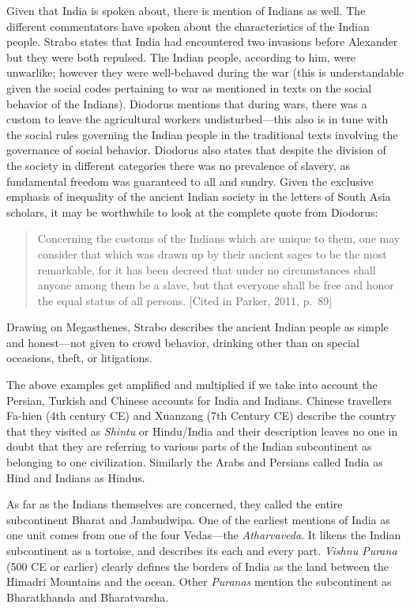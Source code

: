 Given that India is spoken about, there is mention of Indians as well. The different commentators have spoken about the characteristics of the Indian people. Strabo states that India had encountered two invasions before Alexander but they were both repulsed. The Indian people, according to him, were unwarlike; however they were well-behaved during the war (this is understandable given the social codes pertaining to war as mentioned in texts on the social behavior of the Indians). Diodorus mentions that during wars, there was a custom to leave the agricultural workers undisturbed—this also is in tune with the social rules governing the Indian people in the traditional texts involving the governance of social behavior. Diodorus also states that despite the division of the society in different categories there was no prevalence of slavery, as fundamental freedom was guaranteed to all and sundry. Given the exclusive emphasis of inequality of the ancient Indian society in the letters of South Asia scholars, it may be worthwhile to look at the complete quote from Diodorus: 
\begin{quote}
Concerning the customs of the Indians which are unique to them, one may consider that which was drawn up by their ancient sages to be the most remarkable, for it has been decreed that under no circumstances shall anyone among them be a slave, but that everyone shall be free and honor the equal status of all persons. [Cited in Parker, 2011, p.\ 89]
\end{quote}
Drawing on Megasthenes, Strabo describes the ancient Indian people as simple and honest—not given to crowd behavior, drinking other than on special occasions, theft, or litigations.

The above examples get amplified and multiplied if we take into account the Persian, Turkish and Chinese accounts for India and Indians. Chinese travellers Fa-hien (4th century CE) and Xuanzang (7th Century CE) describe the country that they visited as \textit{Shintu} or Hindu/India and their description leaves no one in doubt that they are referring to various parts of the Indian subcontinent as belonging to one civilization. Similarly the Arabs and Persians called India as Hind and Indians as Hindus. 

As far as the Indians themselves are concerned, they called the entire subcontinent Bharat and Jambudwipa. One of the earliest mentions of India as one unit comes from one of the four Vedas—the \textit{Atharvaveda}. It likens the Indian subcontinent as a tortoise, and describes its each and every part. \textit{Vishnu Purana} (500 CE or earlier) clearly defines the borders of India as the land between the Himadri Mountains and the ocean. Other \textit{Puranas} mention the subcontinent as Bharatkhanda and Bharatvarsha. 


